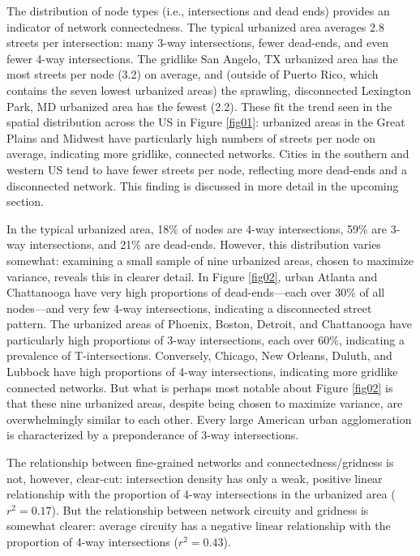 \documentclass[Afour,sageh,times]{sagej}
\begin{document}
The distribution of node types (i.e., intersections and dead ends) provides an indicator of network connectedness. The typical urbanized area averages 2.8 streets per intersection: many 3-way intersections, fewer dead-ends, and even fewer 4-way intersections. The gridlike San Angelo, TX urbanized area has the most streets per node (3.2) on average, and (outside of Puerto Rico, which contains the seven lowest urbanized areas) the sprawling, disconnected Lexington Park, MD urbanized area has the fewest (2.2). These fit the trend seen in the spatial distribution across the US in Figure \ref{fig01}: urbanized areas in the Great Plains and Midwest have particularly high numbers of streets per node on average, indicating more gridlike, connected networks. Cities in the southern and western US tend to have fewer streets per node, reflecting more dead-ends and a disconnected network. This finding is discussed in more detail in the upcoming section.

In the typical urbanized area, 18\% of nodes are 4-way intersections, 59\% are 3-way intersections, and 21\% are dead-ends. However, this distribution varies somewhat: examining a small sample of nine urbanized areas, chosen to maximize variance, reveals this in clearer detail. In Figure \ref{fig02}, urban Atlanta and Chattanooga have very high proportions of dead-ends---each over 30\% of all nodes---and very few 4-way intersections, indicating a disconnected street pattern. The urbanized areas of Phoenix, Boston, Detroit, and Chattanooga have particularly high proportions of 3-way intersections, each over 60\%, indicating a prevalence of T-intersections. Conversely, Chicago, New Orleans, Duluth, and Lubbock have high proportions of 4-way intersections, indicating more gridlike connected networks. But what is perhaps most notable about Figure \ref{fig02} is that these nine urbanized areas, despite being chosen to maximize variance, are overwhelmingly similar to each other. Every large American urban agglomeration is characterized by a preponderance of 3-way intersections.

The relationship between fine-grained networks and connectedness/gridness is not, however, clear-cut: intersection density has only a weak, positive linear relationship with the proportion of 4-way intersections in the urbanized area ($r^{2}=0.17$). But the relationship between network circuity and gridness is somewhat clearer: average circuity has a negative linear relationship with the proportion of 4-way intersections ($r^{2}=0.43$).
\end{document}
